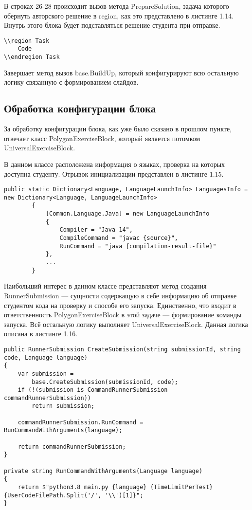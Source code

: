 В строках 26-28 происходит вызов метода PrepareSolution, задача которого обернуть авторского решение в region, как это представлено в листинге 1.14. Внутрь этого блока будет подставляться решение студента при отправке.
\begin{lstlisting}[caption={Оборачивание кода в region}]
\\region Task
    Code
\\endregion Task
\end{lstlisting}

Завершает метод вызов base.BuildUp, который конфигурируют всю остальную логику связанную с формированием слайдов.

\subsection{Обработка конфигурации блока}

За обработку конфигурации блока, как уже было сказано в прошлом пункте, отвечает класс PolygonExerciseBlock, который является потомком UniversalExerciseBlock.

В данном классе расположена информация о языках, проверка на которых доступна студенту. Отрывок инициализации представлен в листинге 1.15.

\begin{lstlisting}[caption={Отрывок инициализации LanguagesInfo}]
public static Dictionary<Language, LanguageLaunchInfo> LanguagesInfo = new Dictionary<Language, LanguageLaunchInfo>
		{
			[Common.Language.Java] = new LanguageLaunchInfo
			{
				Compiler = "Java 14",
				CompileCommand = "javac {source}",
				RunCommand = "java {compilation-result-file}"
			},
			...
		}
\end{lstlisting}

Наибольший интерес в данном классе представляют метод создания RunnerSubmission — сущности содержащую в себе информацию об отправке студентом кода на проверку и способе его запуска. Единственно, что входит в ответственность PolygonExerciseBlock в этой задаче — формирование команды запуска. Всё остальную логику выполняет UniversalExerciseBlock. Данная логика описана в листинге 1.16.

\begin{lstlisting}[caption={Формирование RunnerSubmission}]
public RunnerSubmission CreateSubmission(string submissionId, string code, Language language)
{
	var submission = 
	    base.CreateSubmission(submissionId, code);
	if (!(submission is CommandRunnerSubmission commandRunnerSubmission))
		return submission;
	
	commandRunnerSubmission.RunCommand = RunCommandWithArguments(language);
	
	return commandRunnerSubmission;
}

private string RunCommandWithArguments(Language language)
{
	return $"python3.8 main.py {language} {TimeLimitPerTest} {UserCodeFilePath.Split('/', '\\')[1]}";
}
\end{lstlisting}

